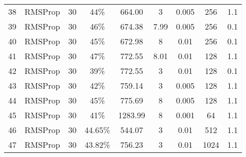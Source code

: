 \documentclass{article}
\begin{document}
\begin{table}[!ht]
{\begin{tabular}{|c|c|c|c|c|c|c|c|c|}
                38 & RMSProp  & 30  & 44\%    & 664.00  & 3      & 0.005 & 256 & 1.1 \\
                39 & RMSProp  & 30  & 46\%    & 674.38  & 7.99   & 0.005 & 256 & 0.1 \\
                40 & RMSProp  & 30  & 45\%    & 672.98  & 8      & 0.01  & 256 & 0.1 \\
                41 & RMSProp  & 30  & 47\%    & 772.55  & 8.01   & 0.01  & 128 & 1.1 \\
                42 & RMSProp  & 30  & 39\%    & 772.55  & 3      & 0.01  & 128 & 0.1 \\
                43 & RMSProp  & 30  & 42\%    & 759.14  & 3      & 0.005 & 128 & 1.1 \\
                44 & RMSProp  & 30  & 45\%    & 775.69  & 8      & 0.005 & 128 & 1.1 \\
                45 & RMSProp  & 30  & 41\%    & 1283.99 & 8      & 0.001 & 64  & 1.1 \\
                46 & RMSProp  & 30  & 44.65\% & 544.07  & 3      & 0.01  & 512 & 1.1 \\
                47 & RMSProp  & 30  & 43.82\% & 756.23  & 3      & 0.01  & 1024 & 1.1 \\
                \hline
            \end{tabular}
        }
        \label{tab:exp_results}
    \end{table}
\end{document}
